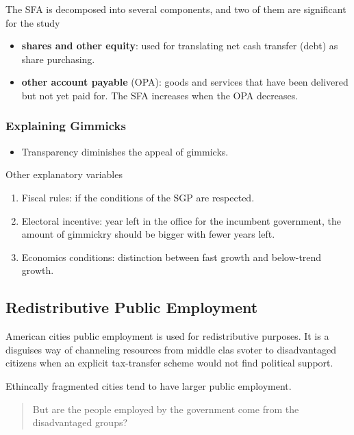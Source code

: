 The SFA is decomposed into several components, and two of them are
significant for the study

\begin{itemize}
\item
  \textbf{shares and other equity}: used for translating net cash
  transfer (debt) as share purchasing.
\item
  \textbf{other account payable} (OPA): goods and services that have
  been delivered but not yet paid for. The SFA increases when the OPA
  decreases.
\end{itemize}

\subsubsection{Explaining Gimmicks}\label{explaining-gimmicks}

\begin{itemize}
\itemsep1pt\parskip0pt
\item
  Transparency diminishes the appeal of gimmicks.
\end{itemize}

Other explanatory variables

\begin{enumerate}
\def\labelenumi{\arabic{enumi}.}
\itemsep1pt\parskip0pt
\item
  Fiscal rules: if the conditions of the SGP are respected.
\item
  Electoral incentive: year left in the office for the incumbent
  government, the amount of gimmickry should be bigger with fewer years
  left.
\item
  Economics conditions: distinction between fast growth and below-trend
  growth.
\end{enumerate}

\subsection{Redistributive Public
Employment}\label{redistributive-public-employment}

American cities public employment is used for redistributive purposes.
It is a disguises way of channeling resources from middle clas svoter to
disadvantaged citizens when an explicit tax-transfer scheme would not
find political support.

Ethincally fragmented cities tend to have larger public employment.

\begin{quote}
But are the people employed by the government come from the
disadvantaged groups?
\end{quote}

